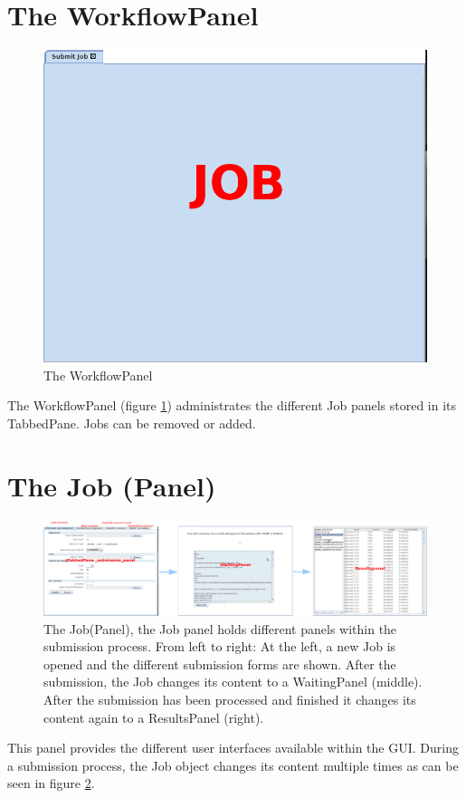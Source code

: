 \documentclass{scrartcl}
\begin{document}
\section{The WorkflowPanel}
	\begin{figure}[htb]
		\centering
		\includegraphics[scale=0.2]{./workFlowPanel}
		\caption{The WorkflowPanel}
		\label{fig:wf}
	\end{figure}
\noindent	The WorkflowPanel (figure \ref{fig:wf}) administrates the different Job panels stored in its TabbedPane. Jobs can be removed or added.  
	
\section{The Job (Panel)}

	\begin{figure}[htb]
		\centering
		\includegraphics[scale=0.25]{./Job}
		\caption{The Job(Panel), the Job panel holds different panels within the submission process. From left to right: At the left, a new Job is opened and the different submission forms are shown. After the submission, the Job changes its content to a WaitingPanel (middle). After the submission has been processed and finished it changes its content again to a ResultsPanel (right).}
		\label{fig:job}
	\end{figure}
\noindent	This panel provides the different user interfaces available within the GUI. During a submission process, the Job object changes its content multiple times as can be seen in figure \ref{fig:job}. 
\end{document}
